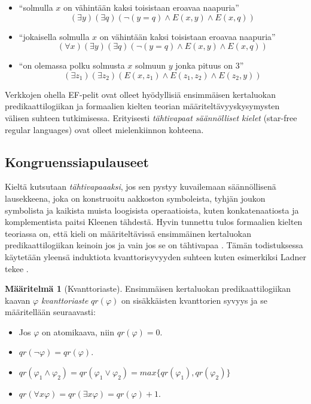 \documentclass[finnish]{tktltiki2}
\theoremstyle{definition}
\newtheorem{maar}[lau]{Määritelmä}
\theoremstyle{remark}
\begin{document}
\begin{itemize}
\item ``solmulla $x$ on vähintään kaksi toisistaan eroavaa naapuria'' \[(\exists y)(\exists q)(\neg(y = q) \land E(x, y) \land E(x, q))\]
\item ``jokaisella solmulla $x$ on vähintään kaksi toisistaan eroavaa naapuria'' \[(\forall x)(\exists y)(\exists q)(\neg(y = q)\land E(x, y) \land E(x, q))\]
\item ``on olemassa polku solmusta $x$ solmuun $y$ jonka pituus on $3$'' \[(\exists z_1)(\exists z_2)(E(x, z_1)\land E(z_1, z_2) \land E(z_2, y))\]
\end{itemize}

Verkkojen ohella EF-pelit ovat olleet hyödyllisiä ensimmäisen kertaluokan predikaattilogiikan ja formaalien kielten teorian määriteltävyyskysymysten välisen suhteen tutkimisessa. Erityisesti \textit{tähtivapaat säännölliset kielet} (star-free regular languages) ovat olleet mielenkiinnon kohteena.

\subsection{Kongruenssiapulauseet}
Kieltä kutsutaan \textit{tähtivapaaaksi}, jos sen pystyy kuvailemaan säännöllisenä lausekkeena, joka on konstruoitu aakkoston symboleista, tyhjän joukon symbolista ja kaikista muista loogisista operaatioista, kuten konkatenaatiosta ja komplementista paitsi Kleenen tähdestä. Hyvin tunnettu tulos formaalien kielten teoriassa on, että kieli on määriteltävissä ensimmäinen kertaluokan predikaattilogiikan keinoin jos ja vain jos se on tähtivapaa \cite{McN71}. Tämän todistuksessa käytetään yleensä induktiota kvanttorisyvyyden suhteen kuten esimerkiksi Ladner tekee \cite{Lad77}.

\begin{maar}[Kvanttoriaste]
Ensimmäisen kertaluokan predikaattilogiikan kaavan $\varphi$ \textit{kvanttoriaste} $qr(\varphi)$ on sisäkkäisten kvanttorien syvyys ja se määritellään seuraavasti:
\begin{itemize}
\item Jos $\varphi$ on atomikaava, niin $qr(\varphi) = 0$.
\item $qr(\neg \varphi) = qr(\varphi)$.
\item $qr(\varphi_1 \land \varphi_2) = qr(\varphi_1 \lor \varphi_2) = max\{qr(\varphi_1), qr(\varphi_2)\}$
\item $qr(\forall x \varphi) = qr(\exists x \varphi) = qr(\varphi) + 1$.
\end{itemize}
\end{maar}
\end{document}
